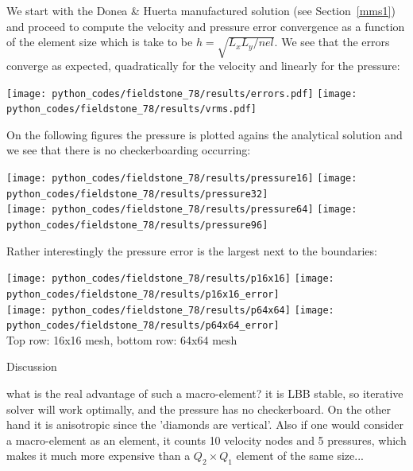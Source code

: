 We start with the Donea \& Huerta manufactured solution (see Section~\ref{mms1}) and 
proceed to compute the velocity and pressure error convergence as a function of the 
element size which is take to be $h = \sqrt{L_xL_y/nel}$. We see that 
the errors converge as expected, quadratically for the velocity and linearly for the pressure:

\begin{center}
\texttt{[image: python\_codes/fieldstone\_78/results/errors.pdf]}
\texttt{[image: python\_codes/fieldstone\_78/results/vrms.pdf]}
\end{center}

On the following figures the pressure is plotted agains the analytical solution and 
we see that there is no checkerboarding occurring:

\begin{center}
\texttt{[image: python\_codes/fieldstone\_78/results/pressure16]}
\texttt{[image: python\_codes/fieldstone\_78/results/pressure32]} \\
\texttt{[image: python\_codes/fieldstone\_78/results/pressure64]}
\texttt{[image: python\_codes/fieldstone\_78/results/pressure96]}
\end{center}

Rather interestingly the pressure error is the largest next to the boundaries:
\begin{center}
\texttt{[image: python\_codes/fieldstone\_78/results/p16x16]}
\texttt{[image: python\_codes/fieldstone\_78/results/p16x16\_error]}\\
\texttt{[image: python\_codes/fieldstone\_78/results/p64x64]}
\texttt{[image: python\_codes/fieldstone\_78/results/p64x64\_error]}\\
{\captionfont Top row: 16x16 mesh, bottom row: 64x64 mesh}
\end{center}

Discussion

what is the real advantage of such a macro-element? it is LBB stable, so 
iterative solver will work optimally, and the pressure has no checkerboard. 
On the other hand it is anisotropic since the 'diamonds are vertical'. 
Also if one would consider a macro-element as an element, it counts 10 velocity nodes and 5 pressures, 
which makes it much more expensive than a $Q_2\times Q_1$ element of the same size...


